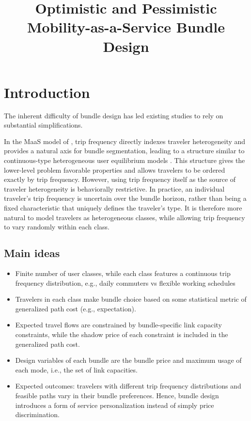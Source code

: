 \documentclass{article}
\title{Optimistic and Pessimistic Mobility-as-a-Service Bundle Design}
\newcommand{\jl}[1]{{\color{blue}{\noindent #1}}}
\begin{document}
\maketitle

\section{Introduction}

\jl{What is real bunlde and why it's hard}

The inherent difficulty of bundle design has led existing studies to rely on substantial simplifications.

In the MaaS model of \citet{LiEtAlMaaSContinuous}, trip frequency directly indexes traveler heterogeneity and provides a natural axis for bundle segmentation, leading to a structure similar to continuous-type heterogeneous user equilibrium models \citep{dial1996,xie2026,Wang2026,xu2026}. This structure gives the lower-level problem favorable properties and allows travelers to be ordered exactly by trip frequency. However, using trip frequency itself as the source of traveler heterogeneity is behaviorally restrictive. In practice, an individual traveler's trip frequency is uncertain over the bundle horizon, rather than being a fixed characteristic that uniquely defines the traveler's type. It is therefore more natural to model travelers as heterogeneous classes, while allowing trip frequency to vary randomly within each class.

\subsection{Main ideas}
\begin{itemize}
    \item Finite number of user classes, while each class features a continuous trip frequency distribution, e.g., daily commuters vs flexible working schedules
    \item Travelers in each class make bundle choice based on some statistical metric of generalized path cost (e.g., expectation).
    \item Expected travel flows are constrained by bundle-specific link capacity constraints, while the shadow price of each constraint is included in the generalized path cost.
    \item Design variables of each bundle are the bundle price and maximum usage of each mode, i.e., the set of link capacities.
    \item Expected outcomes: travelers with different trip frequency distributions and feasible paths vary in their bundle preferences. Hence, bundle design introduces a form of service personalization instead of simply price discrimination.
\end{itemize}
\end{document}
